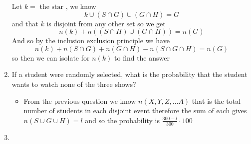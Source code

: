 \documentclass[11pt]{book}
\begin{document}
\begin{enumerate}[label=\alph*)]
\begin{center}
        \end{center}
        Let $k = \text{ the star } $,  we know 
        \[
            k\cup \left( S\cap G \right) \cup \left( G\cap H \right) = G
        \]
        and that $k$ is disjoint from any other set so we get 
        \[
            n\left(k\right)  + n\left(\left( S\cap H \right) \cup \left( G\cap H \right) \right) = n\left(G\right) 
        \]
        And so by the inclusion exclusion principle we have
        \[
        n\left(k\right)  + n\left(S\cap G\right)  + n\left(G\cap H\right)  - n\left(S\cap G\cap H\right) = n\left(G\right) 
        \]
        so then we can isolate for $n\left(k\right) $ to find the answer  
    \item If a student were randomly selected, what is the probability that the student wants to watch none of the three shows?
        \begin{itemize}
            \item From the previous question we know $n\left(X, Y, Z, \ldots A \right) $ that is the total number of students in each disjoint event therefore the sum of each gives $n\left(S\cup G\cup H\right) = l$  and so the probability is $\frac{300 - l}{300} \cdot  100$ 
        \end{itemize}  
    \item {} 
\end{enumerate}





\end{document}
